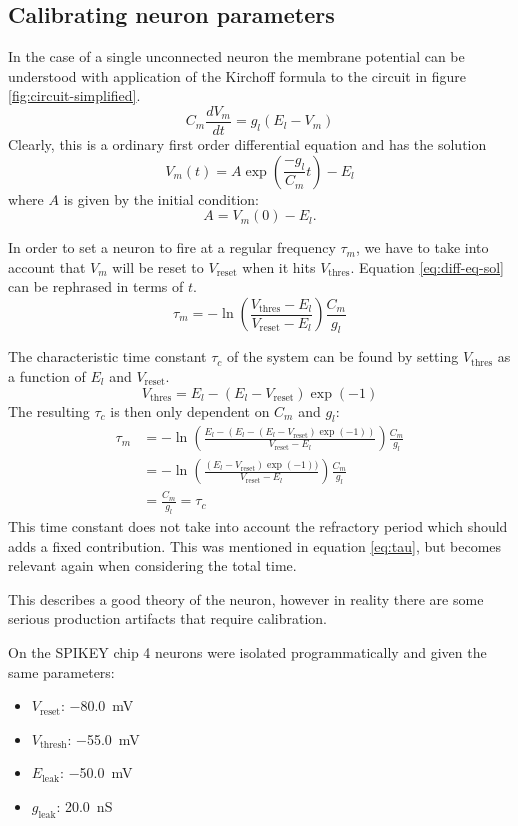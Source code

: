 \documentclass[a4paper,twocolumn]{article}
\begin{document}
\subsection{Calibrating neuron parameters}

In the case of a single unconnected neuron the membrane potential can be
understood with application of the Kirchoff formula to the circuit in figure
\ref{fig:circuit-simplified}.
\[
    C_m \frac{dV_m}{dt} = g_l(E_l - V_m)
\]
Clearly, this is a ordinary first order differential equation and has the
solution
\begin{equation}
    V_m(t) = A \exp(\frac{-g_l}{C_m}t) - E_l
    \label{eq:diff-eq-sol}
\end{equation}
where $A$ is given by the initial condition:
\[
    A = V_m(0) - E_l.
\]

In order to set a neuron to fire at a regular frequency $\tau_m$, we have to take
into account that $V_m$ will be reset to $V_\text{reset}$ when it hits
$V_\text{thres}$. Equation \eqref{eq:diff-eq-sol} can be rephrased in terms of
$t$.
\[
    \tau_m = -\ln(\frac{V_\text{thres} - E_l}{V_\text{reset} - E_l})
    \frac{C_m}{g_l}
\]

The characteristic time constant $\tau_c$ of the system can be found by setting
$V_\text{thres}$ as a function of $E_l$ and $V_\text{reset}$.
\[
    V_\text{thres} = E_l - (E_l - V_\text{reset})\exp(-1)
\]
The resulting $\tau_c$ is then only dependent on $C_m$ and $g_l$:
\begin{align*}
    \tau_m &= -\ln(\frac{E_l - (E_l - (E_l - V_\text{reset})\exp(-1))}{V_\text{reset} - E_l}) \frac{C_m}{g_l}\\
           &= -\ln(\frac{(E_l - V_\text{reset})\exp(-1))}{V_\text{reset} - E_l})\frac{C_m}{g_l} \\
           &= \frac{C_m}{g_l} = \tau_c
\end{align*}
This time constant does not take into account the refractory period which should
adds a fixed contribution. This was mentioned in equation \eqref{eq:tau}, but
becomes relevant again when considering the total time.

This describes a good theory of the neuron, however in reality there are some
serious production artifacts that require calibration.

On the SPIKEY chip 4 neurons were isolated programmatically and given the same
parameters:
\begin{itemize}
    \item $V_\text{reset}$: \SI{-80.0}{\milli\volt}
    \item $V_\text{thresh}$: \SI{-55.0}{\milli\volt}
    \item $E_\text{leak}$: \SI{-50.0}{\milli\volt}
    \item $g_\text{leak}$:  \SI{20.0}{\nano\siemens}
\end{itemize}
\end{document}
